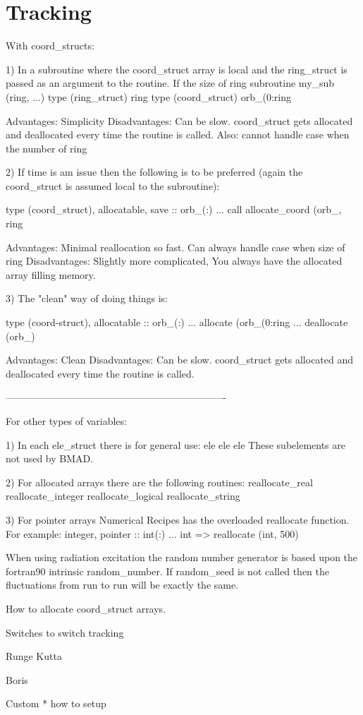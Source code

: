 \chapter{Tracking}

With coord_structs:

1) In a subroutine where the coord_struct array is local and the ring_struct is passed as an argument to the routine. If the size of ring%
      subroutine my_sub (ring, ...)
      type (ring_struct) ring
      type (coord_struct) orb_(0:ring%

Advantages: Simplicity
Disadvantages: Can be slow. coord_struct gets allocated and deallocated every time the routine is called. Also: cannot handle case when the number of ring%

2) If time is am issue then the following is to be preferred (again the coord_struct is assumed local to the subroutine):

      type (coord_struct), allocatable, save :: orb_(:)
      ...
      call allocate_coord (orb_, ring%

Advantages: Minimal reallocation so fast.
  Can always handle case when size of ring%
Disadvantages: Slightly more complicated, You always have the allocated array
  filling memory.

3) The "clean" way of doing things is:

      type (coord-struct), allocatable :: orb_(:)
      ...
      allocate (orb_(0:ring%
      ...
      deallocate (orb_)

Advantages: Clean
Disadvantages: Can be slow. coord_struct gets allocated and deallocated every
  time the routine is called.

-------------------------------------------------------------------

For other types of variables:

1) In each ele_struct there is for general use:
      ele%
      ele%
      ele%
These subelements are not used by BMAD.


2) For allocated arrays there are the following routines:
      reallocate_real
      reallocate_integer
      reallocate_logical
      reallocate_string

3) For pointer arrays Numerical Recipes has the overloaded reallocate function.
For example:
      integer, pointer :: int(:)
      ...
      int => reallocate (int, 500)





When using radiation excitation the random number generator is based
upon the fortran90 intrinsic random\_number. If random\_seed is not called
then the fluctuations from run to run will be exactly the same.


How to allocate coord\_struct arrays. 

  Switches to switch tracking

  Runge Kutta

  Boris

  Custom
    * how to setup

